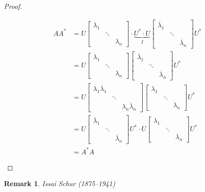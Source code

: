 \documentclass{article}
\newtheorem{remark}{Remark}  \numberwithin{remark}{section}
\begin{document}
\begin{proof}
\begin{description}
      \begin{align*}
        A A^* &= U \begin{bmatrix} \lambda_1 & & \\ & \ddots & \\ & & \lambda_n \end{bmatrix} \cdot \underbrace{U^* \cdot U}_{I} \begin{bmatrix} \overline{\lambda}_1 & & \\ & \ddots & \\ & & \overline{\lambda}_n \end{bmatrix} U^* \\
          &= U \begin{bmatrix} \lambda_1 & & \\ & \ddots & \\ & & \lambda_n \end{bmatrix} \begin{bmatrix} \overline\lambda_1 & & \\ & \ddots & \\ & & \overline\lambda_n \end{bmatrix} U^* \\
          &= U \begin{bmatrix} \lambda_1 \overline\lambda_1 & & \\ & \ddots & \\ & & \lambda_n \overline\lambda_n \end{bmatrix} \begin{bmatrix} \lambda_1 & & \\ & \ddots & \\ & & \lambda_n \end{bmatrix} U^* \\
          &= U \begin{bmatrix} \overline\lambda_1 & & \\ & \ddots & \\ & & \overline\lambda_n \end{bmatrix} U^* \cdot U \begin{bmatrix} \lambda_1 & & \\ & \ddots & \\ & & \lambda_n \end{bmatrix} U^* \\
          &= A^* A
      \end{align*}
  \end{description}
\end{proof}

\begin{remark}
  Issai Schur (1875--1941)
\end{remark}
\end{document}
